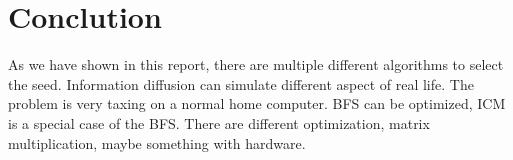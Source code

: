 \chapter{Conclution}
As we have shown in this report, there are multiple different algorithms to select the seed. Information diffusion can simulate different aspect of real life. The problem is very taxing on a normal home computer. BFS can be optimized, ICM is a special case of the BFS. There are different optimization, matrix multiplication, maybe something with hardware. 